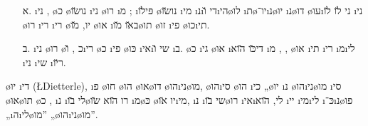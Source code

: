 \begin{enumerate}
	\item[א.] \i{ני} ,  \o{כ} \o{נו}\u{שו} \i{ני} \o{רו} \i{מ} ;  \i{פּי}\u{לו}  \o{נו}\u{שו} \i{מי} \i{נ}\i{די} \u{ו}\i{הי}\o{לו} \i{ת}\o{יו}־\i{נ}\o{יו} \i{נ}\o{דו} \o{עו}\i{ני} \u{לו}  \u{לו} \i{ני} \o{רו}  \i{רי} \i{רי} \o{יו},  \u{מו} \o{או} \i{ב}\u{או}    \u{מו}\o{תו} \o{זו}   \i{פי} \o{כו}\i{תי}.
	\item[ב.] \i{ני} \o{רו} \o{כ}    , \u{ו}\i{רי} \o{כ}  \i{פי} \o{כּו} \i{אי}\i{שי} \u{ו} \i{ב}. \o{כ} \i{גי} \o{או} \i{די}\u{כּו}     \u{הוא} \i{מ} , ,  \o{או}  \i{תי} \i{רי} \i{מ}\i{לי} \i{ני} \i{שי} \i{ר}\u{יו}.
\end{enumerate}

\o{יו} \i{די} (\L{Dietterle}),  \i{פ}  \o{חו}  \o{הו} \o{או}\o{דו} \o{הו}\i{ני}\o{מו}, \o{הו}\i{סי}   \o{הו} \i{כי} „\o{יו} \i{נ}  \o{הו}\i{ני}\o{מו} \i{סי} \o{או}\o{תו}  \o{כ} , \i{נ} \i{לי} \u{בו}\o{רו} \u{הוא}  \u{שו}  \i{מ}\o{כּ} \o{יו}   \u{או}\i{מי},  \i{נ} \i{שי} \u{בו}\o{רו}     \i{אי}\i{לי},   \u{הוא} \i{יי} \i{מי}\i{לי} \i{כּ}־\i{נ}\o{פו} „\i{ה}\i{לי}\o{מו}” „\o{הו}\i{ני}\o{מו}”.
